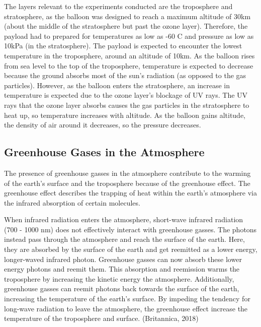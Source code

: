 \documentclass[12pt,]{article}
\begin{document}
The layers relevant to the experiments conducted are the troposphere and
stratosphere, as the balloon was designed to reach a maximum altitude of
30km (about the middle of the stratosphere but past the ozone layer).
Therefore, the payload had to prepared for temperatures as low as -60
\degree C and pressure as low as 10kPa (in the stratosphere). The
payload is expected to encounter the lowest temperature in the
troposphere, around an altitude of 10km. As the balloon rises from sea
level to the top of the troposphere, temperature is expected to decrease
because the ground absorbs most of the sun's radiation (as opposed to
the gas particles). However, as the balloon enters the stratosphere, an
increase in temperature is expected due to the ozone layer's blockage of
UV rays. The UV rays that the ozone layer absorbs causes the gas
particles in the stratosphere to heat up, so temperature increases with
altitude. As the balloon gains altitude, the density of air around it
decreases, so the pressure decreases.

\subsection{Greenhouse Gases in the
Atmosphere}\label{greenhouse-gases-in-the-atmosphere}

The presence of greenhouse gasses in the atmosphere contribute to the
warming of the earth's surface and the troposphere because of the
greenhouse effect. The greenhouse effect describes the trapping of heat
within the earth's atmosphere via the infrared absorption of certain
molecules.

When infrared radiation enters the atmosphere, short-wave infrared
radiation (700 - 1000 nm) does not effectively interact with greenhouse
gasses. The photons instead pass through the atmosphere and reach the
surface of the earth. Here, they are absorbed by the surface of the
earth and get reemitted as a lower energy, longer-waved infrared photon.
Greenhouse gasses can now absorb these lower energy photons and reemit
them. This absorption and reemission warms the troposphere by increasing
the kinetic energy the atmosphere. Additionally, greenhouse gasses can
reemit photons back towards the surface of the earth, increasing the
temperature of the earth's surface. By impeding the tendency for
long-wave radiation to leave the atmosphere, the greenhouse effect
increase the temperature of the troposphere and surface. (Britannica,
2018)
\end{document}
